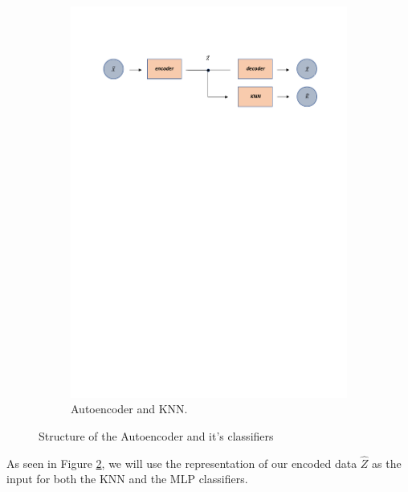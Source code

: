 \documentclass[12pt]{report}
\begin{document}
\begin{figure}[H]
\begin{subfigure}{0.98\linewidth} 
  \centering
  \includegraphics[width=\linewidth]{Figuras_tfg/Diagram_auto_KNN}
  \caption{Autoencoder and KNN.}
  \label{fig:FigB_Autoencoder_KNN} 
\end{subfigure}
  \caption{Structure of the Autoencoder and it's classifiers}
 \label{fig:Autoencoder_architecture}
\end{figure}

As seen in Figure \ref{fig:Autoencoder_architecture}, we will use the representation of our encoded data $\hat{Z}$ as the input for both the KNN and the MLP classifiers.
\end{document}

